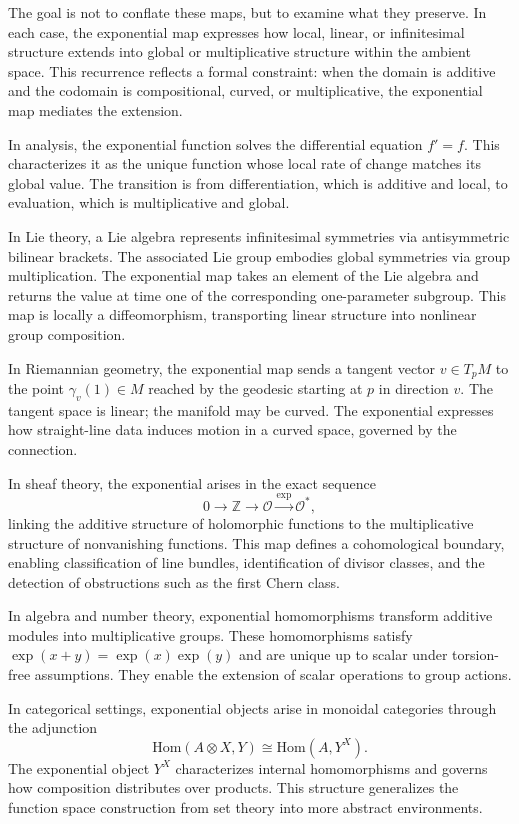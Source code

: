 The goal is not to conflate these maps, but to examine what they preserve. In each case, the exponential map expresses how local, linear, or infinitesimal structure extends into global or multiplicative structure within the ambient space. This recurrence reflects a formal constraint: when the domain is additive and the codomain is compositional, curved, or multiplicative, the exponential map mediates the extension.

In analysis, the exponential function solves the differential equation \( f' = f \). This characterizes it as the unique function whose local rate of change matches its global value. The transition is from differentiation, which is additive and local, to evaluation, which is multiplicative and global.

In Lie theory, a Lie algebra represents infinitesimal symmetries via antisymmetric bilinear brackets. The associated Lie group embodies global symmetries via group multiplication. The exponential map takes an element of the Lie algebra and returns the value at time one of the corresponding one-parameter subgroup. This map is locally a diffeomorphism, transporting linear structure into nonlinear group composition.

In Riemannian geometry, the exponential map sends a tangent vector \( v \in T_p M \) to the point \( \gamma_v(1) \in M \) reached by the geodesic starting at \( p \) in direction \( v \). The tangent space is linear; the manifold may be curved. The exponential expresses how straight-line data induces motion in a curved space, governed by the connection.

In sheaf theory, the exponential arises in the exact sequence
\[
0 \to \mathbb{Z} \to \mathcal{O} \xrightarrow{\exp} \mathcal{O}^*,
\]
linking the additive structure of holomorphic functions to the multiplicative structure of nonvanishing functions. This map defines a cohomological boundary, enabling classification of line bundles, identification of divisor classes, and the detection of obstructions such as the first Chern class.

In algebra and number theory, exponential homomorphisms transform additive modules into multiplicative groups. These homomorphisms satisfy \( \exp(x + y) = \exp(x)\exp(y) \) and are unique up to scalar under torsion-free assumptions. They enable the extension of scalar operations to group actions.

In categorical settings, exponential objects arise in monoidal categories through the adjunction
\[
\mathrm{Hom}(A \otimes X, Y) \cong \mathrm{Hom}(A, Y^X).
\]
The exponential object \( Y^X \) characterizes internal homomorphisms and governs how composition distributes over products. This structure generalizes the function space construction from set theory into more abstract environments.


